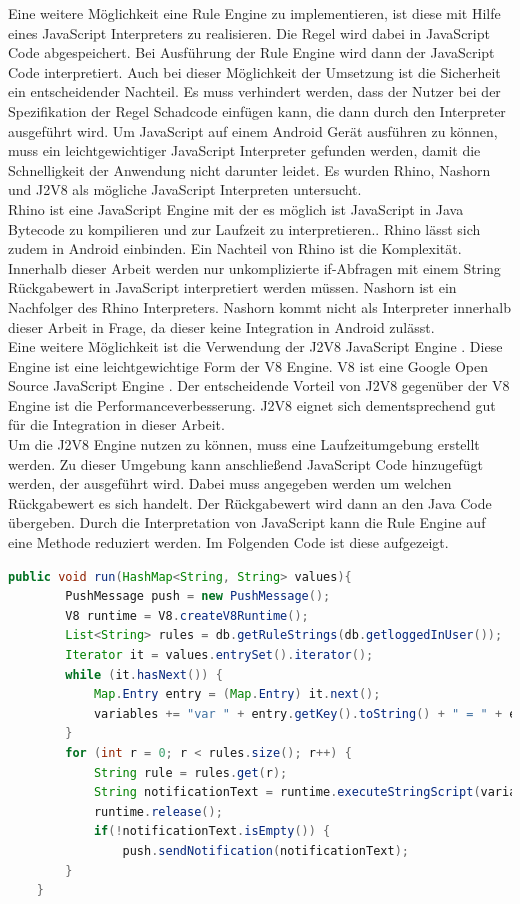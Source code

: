 Eine weitere Möglichkeit eine Rule Engine zu implementieren, ist diese mit Hilfe eines JavaScript Interpreters zu realisieren. Die Regel wird dabei in JavaScript Code abgespeichert. Bei Ausführung der Rule Engine wird dann der JavaScript Code interpretiert. Auch bei dieser Möglichkeit der Umsetzung ist die Sicherheit ein entscheidender Nachteil. Es muss verhindert werden, dass der Nutzer bei der Spezifikation der Regel Schadcode einfügen kann, die dann durch den Interpreter ausgeführt wird. Um JavaScript auf einem Android Gerät ausführen zu können, muss ein leichtgewichtiger JavaScript Interpreter gefunden werden, damit die Schnelligkeit der Anwendung nicht darunter leidet. Es wurden Rhino, Nashorn und J2V8 als mögliche  JavaScript Interpreten untersucht.\\
Rhino ist eine JavaScript Engine mit der es möglich ist JavaScript in Java Bytecode zu kompilieren und zur Laufzeit zu interpretieren.\cite{mozilla:rhino}. Rhino lässt sich zudem in Android einbinden. Ein Nachteil von Rhino ist die Komplexität. Innerhalb dieser Arbeit werden nur unkomplizierte if-Abfragen mit einem String Rückgabewert in JavaScript interpretiert werden müssen. Nashorn ist ein Nachfolger des Rhino Interpreters. Nashorn kommt nicht als Interpreter innerhalb dieser Arbeit in Frage, da dieser keine Integration in Android zulässt.\\
Eine weitere Möglichkeit ist die Verwendung der J2V8 JavaScript Engine \cite{github:j2v8}. Diese Engine ist eine leichtgewichtige Form der V8 Engine. V8 ist eine Google Open Source JavaScript Engine \cite{github:v8}. Der entscheidende Vorteil von J2V8 gegenüber der V8 Engine ist die Performanceverbesserung. J2V8 eignet sich dementsprechend gut für die Integration in dieser Arbeit.\\
Um die J2V8 Engine nutzen zu können, muss eine Laufzeitumgebung erstellt werden. Zu dieser Umgebung kann anschließend JavaScript Code hinzugefügt werden, der ausgeführt wird. Dabei muss angegeben werden um welchen Rückgabewert es sich handelt. Der Rückgabewert wird dann an den Java Code übergeben. Durch die Interpretation von JavaScript kann die Rule Engine auf eine Methode reduziert werden. Im Folgenden Code ist diese aufgezeigt.
\begin{lstlisting}[language=java]
	public void run(HashMap<String, String> values){
		PushMessage push = new PushMessage();
    	V8 runtime = V8.createV8Runtime();
        List<String> rules = db.getRuleStrings(db.getloggedInUser());
        Iterator it = values.entrySet().iterator();
        while (it.hasNext()) {
            Map.Entry entry = (Map.Entry) it.next();
            variables += "var " + entry.getKey().toString() + " = " + entry.getValue() + ";";
        }
        for (int r = 0; r < rules.size(); r++) {
            String rule = rules.get(r);
            String notificationText = runtime.executeStringScript(variables + rule);
            runtime.release();
            if(!notificationText.isEmpty()) {
                push.sendNotification(notificationText);
        }
    }
\end{lstlisting}
